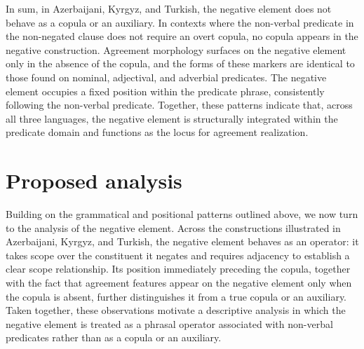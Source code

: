 \documentclass[10pt, a4paper]{article}
\begin{document}
In sum, in Azerbaijani, Kyrgyz, and Turkish, the negative element does not behave as a copula or an auxiliary. In contexts where the non-verbal predicate in the non-negated clause does not require an overt copula, no copula appears in the negative construction. Agreement morphology surfaces on the negative element only in the absence of the copula, and the forms of these markers are identical to those found on nominal, adjectival, and adverbial predicates. The negative element occupies a fixed position within the predicate phrase, consistently following the non-verbal predicate. Together, these patterns indicate that, across all three languages, the negative element is structurally integrated within the predicate domain and functions as the locus for agreement realization.

\section{Proposed analysis}

Building on the grammatical and positional patterns outlined above, we now turn to the analysis of the negative element.
Across the constructions illustrated in Azerbaijani, Kyrgyz, and Turkish, the negative element behaves as an operator: it takes scope over the constituent it negates and requires adjacency to establish a clear scope relationship.
Its position immediately preceding the copula, together with the fact that agreement features appear on the negative element only when the copula is absent, further distinguishes it from a true copula or an auxiliary.
Taken together, these observations motivate a descriptive analysis in which the negative element is treated as a phrasal operator associated with non-verbal predicates rather than as a copula or an auxiliary.
\end{document}
